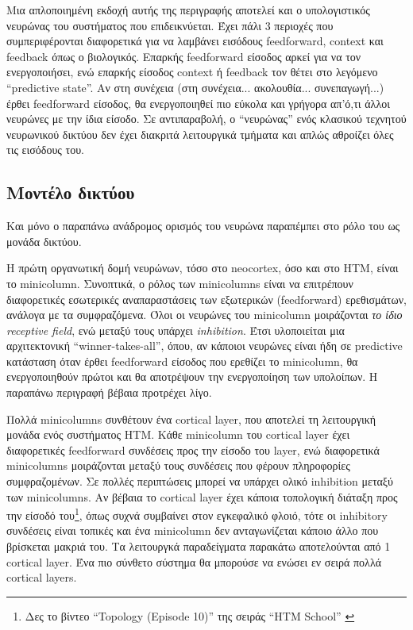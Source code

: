 Μια απλοποιημένη εκδοχή αυτής της περιγραφής αποτελεί και ο υπολογιστικός νευρώνας του συστήματος που επιδεικνύεται.
Έχει πάλι 3 περιοχές που συμπεριφέρονται διαφορετικά για να λαμβάνει εισόδους feedforward, context και feedback όπως ο βιολογικός.
Επαρκής feedforward είσοδος αρκεί για να τον ενεργοποιήσει, ενώ επαρκής είσοδος context ή feedback τον θέτει στο λεγόμενο ``predictive state''.
Αν στη συνέχεια (στη συνέχεια...
ακολουθία...
συνεπαγωγή...) έρθει feedforward είσοδος, θα ενεργοποιηθεί πιο εύκολα και γρήγορα απ'ό,τι άλλοι νευρώνες με την ίδια είσοδο.
Σε αντιπαραβολή, ο ``νευρώνας'' ενός κλασικού τεχνητού νευρωνικού δικτύου δεν έχει διακριτά λειτουργικά τμήματα και απλώς αθροίζει όλες τις εισόδους του.


\subsection{Μοντέλο δικτύου}

Και μόνο ο παραπάνω ανάδρομος ορισμός του νευρώνα παραπέμπει στο ρόλο του ως μονάδα δικτύου.

Η πρώτη οργανωτική δομή νευρώνων, τόσο στο neocortex, όσο και στο HTM, είναι το minicolumn.
Συνοπτικά, ο ρόλος των minicolumns είναι να επιτρέπουν διαφορετικές εσωτερικές αναπαραστάσεις των εξωτερικών (feedforward) ερεθισμάτων, ανάλογα με τα συμφραζόμενα.
Όλοι οι νευρώνες του minicolumn μοιράζονται \emph{το ίδιο receptive field}, ενώ μεταξύ τους υπάρχει \emph{inhibition}.
Έτσι υλοποιείται μια αρχιτεκτονική ``winner-takes-all'', όπου, αν κάποιοι νευρώνες είναι ήδη σε predictive κατάσταση όταν έρθει feedforward είσοδος που ερεθίζει το minicolumn, θα ενεργοποιηθούν πρώτοι και θα αποτρέψουν την ενεργοποίηση των υπολοίπων.
Η παραπάνω περιγραφή βέβαια προτρέχει λίγο.

Πολλά minicolumns συνθέτουν ένα cortical layer, που αποτελεί τη λειτουργική μονάδα ενός συστήματος HTM.
Κάθε minicolumn του cortical layer έχει διαφορετικές feedforward συνδέσεις προς την είσοδο του layer, ενώ διαφορετικά minicolumns μοιράζονται μεταξύ τους συνδέσεις που φέρουν πληροφορίες συμφραζομένων.
Σε πολλές περιπτώσεις μπορεί να υπάρχει ολικό inhibition μεταξύ των minicolumns.
Αν βέβαια το cortical layer έχει κάποια τοπολογική διάταξη προς την είσοδό του\footnote{Δες το βίντεο ``Topology (Episode 10)'' της σειράς ``HTM School'' \cite{htmschool}}, όπως συχνά συμβαίνει στον εγκεφαλικό φλοιό, τότε οι inhibitory συνδέσεις είναι τοπικές και ένα minicolumn δεν ανταγωνίζεται κάποιο άλλο που βρίσκεται μακριά του.
Τα λειτουργκά παραδείγματα παρακάτω αποτελούνται από 1 cortical layer.
Ένα πιο σύνθετο σύστημα θα μπορούσε να ενώσει εν σειρά πολλά cortical layers.

